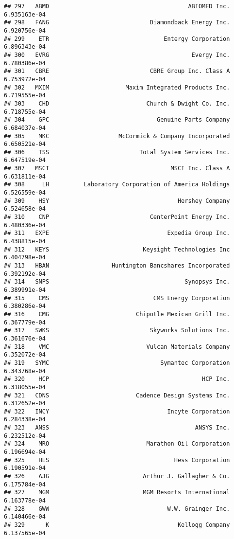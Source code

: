 \documentclass[
]{article}
\begin{document}
\begin{verbatim}
## 297   ABMD                                        ABIOMED Inc. 6.935163e-04
## 298   FANG                             Diamondback Energy Inc. 6.920756e-04
## 299    ETR                                 Entergy Corporation 6.896343e-04
## 300   EVRG                                         Evergy Inc. 6.780386e-04
## 301   CBRE                             CBRE Group Inc. Class A 6.753972e-04
## 302   MXIM                      Maxim Integrated Products Inc. 6.719555e-04
## 303    CHD                            Church & Dwight Co. Inc. 6.718755e-04
## 304    GPC                               Genuine Parts Company 6.684037e-04
## 305    MKC                    McCormick & Company Incorporated 6.650521e-04
## 306    TSS                          Total System Services Inc. 6.647519e-04
## 307   MSCI                                   MSCI Inc. Class A 6.631811e-04
## 308     LH          Laboratory Corporation of America Holdings 6.526559e-04
## 309    HSY                                     Hershey Company 6.524658e-04
## 310    CNP                             CenterPoint Energy Inc. 6.480336e-04
## 311   EXPE                                  Expedia Group Inc. 6.438815e-04
## 312   KEYS                           Keysight Technologies Inc 6.404798e-04
## 313   HBAN                  Huntington Bancshares Incorporated 6.392192e-04
## 314   SNPS                                       Synopsys Inc. 6.389991e-04
## 315    CMS                              CMS Energy Corporation 6.380286e-04
## 316    CMG                         Chipotle Mexican Grill Inc. 6.367779e-04
## 317   SWKS                             Skyworks Solutions Inc. 6.361676e-04
## 318    VMC                            Vulcan Materials Company 6.352072e-04
## 319   SYMC                                Symantec Corporation 6.343768e-04
## 320    HCP                                            HCP Inc. 6.318055e-04
## 321   CDNS                         Cadence Design Systems Inc. 6.312652e-04
## 322   INCY                                  Incyte Corporation 6.284338e-04
## 323   ANSS                                          ANSYS Inc. 6.232512e-04
## 324    MRO                            Marathon Oil Corporation 6.196694e-04
## 325    HES                                    Hess Corporation 6.190591e-04
## 326    AJG                           Arthur J. Gallagher & Co. 6.175784e-04
## 327    MGM                           MGM Resorts International 6.163778e-04
## 328    GWW                                  W.W. Grainger Inc. 6.140466e-04
## 329      K                                     Kellogg Company 6.137565e-04

\end{verbatim}
\end{document}
